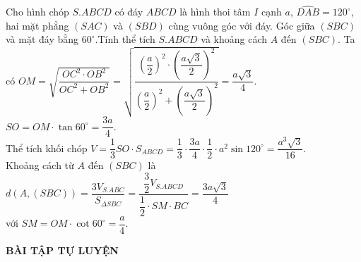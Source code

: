 \begin{vd}%
	Cho hình chóp $S.ABCD$ có đáy $ABCD$ là hình thoi tâm $I$ cạnh $a$, $\widehat{DAB}=120^\circ$, hai mặt phẳng $(SAC)$ và $(SBD)$ cùng vuông góc với đáy. Góc giữa $(SBC)$ và mặt đáy bằng $60^\circ$.Tính thể tích $S.ABCD$ và khoảng cách $A$ đến $(SBC)$.
Ta có $OM=\sqrt{\dfrac{OC^2\cdot OB^2}{OC^2+OB^2}}=\sqrt{\dfrac{\left(\dfrac{a}{2}\right)^2\cdot\left(\dfrac{a\sqrt{3}}{2}\right)^2}{\left(\dfrac{a}{2}\right)^2+\left(\dfrac{a\sqrt{3}}{2}\right)^2}}=\dfrac{a\sqrt{3}}{4}$.\\
$SO=OM\cdot\tan 60^\circ=\dfrac{3a}{4}.$\\
Thể tích khối chóp $V=\dfrac{1}{3}SO\cdot S_{ABCD}=\dfrac{1}{3}\cdot\dfrac{3a}{4}\cdot\dfrac{1}{2}\cdot a^2\sin 120^\circ=\dfrac{a^3\sqrt{3}}{16}.$\\
Khoảng cách từ $A$ đến $(SBC)$ là $d(A,(SBC))=\dfrac{3V_{S.ABC}}{S_{\Delta  SBC}}=\dfrac{\dfrac{3}{2}V_{S.ABCD}}{\dfrac{1}{2}\cdot SM\cdot BC}=\dfrac{3a\sqrt{3}}{4}$\\ với $SM=OM\cdot\cot 60^\circ=\dfrac{a}{4}$.
\end{vd}
\begin{center}
\textbf{BÀI TẬP TỰ LUYỆN}
\end{center}
